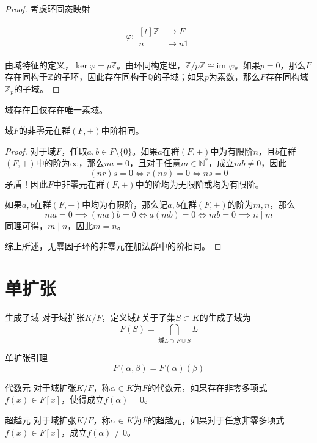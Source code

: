 \documentclass[lang = cn, scheme = chinese, thmcnt = section]{elegantbook}
\newcommand{\N}{\mathbb{N}}            %
\newcommand{\Q}{\mathbb{Q}}            %
\newcommand{\Z}{\mathbb{Z}}            %
\newcommand{\sub}{\subset}             %
\newcommand{\im}{\text{im }}           %
\newcommand{\function}[5]{
	\begin{align*}
		#1:\begin{aligned}[t]
			#2 &\longrightarrow #3\\
			#4 &\longmapsto #5
		\end{aligned}
	\end{align*}
}                                     %
\begin{document}
\begin{proof}
	考虑环同态映射
	\function{\varphi}{\Z}{F}{n}{n1}
	由域特征的定义，$\ker\varphi=p\Z$。由环同构定理，$\Z/p\Z\cong \im \varphi$。如果$p=0$，那么$F$存在同构于$\Z$的子环，因此存在同构于$\Q$的子域；如果$p$为素数，那么$F$存在同构域$\Z_p$的子域。
\end{proof}

\begin{corollary}
	域存在且仅存在唯一素域。
\end{corollary}

\begin{proposition}
	域$F$的非零元在群$(F,+)$中阶相同。
\end{proposition}

\begin{proof}
	对于域$F$，任取$a,b\in F\setminus\{0\}$。如果$a$在群$(F,+)$中为有限阶$n$，且$b$在群$(F,+)$中的阶为$\infty$，那么$na=0$，且对于任意$m\in\N^*$，成立$mb\ne 0$，因此
	$$
	(nr)s=0\iff 
	r(ns)=0\iff 
	ns=0
	$$
	矛盾！因此$F$中非零元在群$(F,+)$中的阶均为无限阶或均为有限阶。
	
	如果$a,b$在群$(F,+)$中均为有限阶，那么记$a,b$在群$(F,+)$的阶为$m,n$，那么
	$$
	ma=0\implies
	(ma)b=0\iff
	a(mb)=0\iff
	mb=0\implies
	n\mid m
	$$
	同理可得，$m\mid n$，因此$m=n$。
	
	综上所述，无零因子环的非零元在加法群中的阶相同。
\end{proof}

\section{单扩张}

\begin{definition}{生成子域}
	对于域扩张$K/F$，定义域$F$关于子集$S\sub K$的生成子域为
	$$
	F(S)=\bigcap_{\text{域}L\supset F\cup S}L
	$$
\end{definition}

\begin{lemma}{}{单扩张引理}
	$$
	F(\alpha,\beta)=F(\alpha)(\beta)
	$$
\end{lemma}

\begin{definition}{代数元}
	对于域扩张$K/F$，称$\alpha\in K$为$F$的代数元，如果存在非零多项式$f(x)\in F[x]$，使得成立$f(\alpha)=0$。
\end{definition}

\begin{definition}{超越元}
	对于域扩张$K/F$，称$\alpha\in K$为$F$的超越元，如果对于任意非零多项式$f(x)\in F[x]$，成立$f(\alpha)\ne 0$。
\end{definition}
\end{document}
